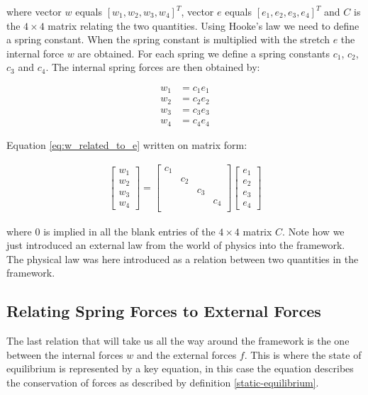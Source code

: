 where vector $w$ equals $[w_1, w_2, w_3, w_4]^T$, vector $e$ equals
$[e_1, e_2, e_3, e_4]^T$ and $C$ is the $4 \times 4$ matrix relating the two
quantities. Using Hooke's law we need to define a spring constant. When
the spring constant is multiplied with the stretch $e$ the internal
force $w$ are obtained. For each spring we define
a spring constants $c_1$, $c_2$, $c_3$ and $c_4$. The internal
spring forces are then obtained by:

\begin{align*}
w_1 &= c_1 e_1 \\
w_2 &= c_2 e_2 \\
w_3 &= c_3 e_3 \\
w_4 &= c_4 e_4
\end{align*}

Equation \eqref{eq:w_related_to_e} written on matrix form:

\begin{align}
\begin{bmatrix}
w_1 \\ w_2\\ w_3 \\ w_4
\end{bmatrix}
=
\begin{bmatrix}
c_1 &  &  &  \\
 & c_2 &  &  \\
 &  & c_3 &  \\
 &  &  & c_4 \\
\end{bmatrix}
\begin{bmatrix}
e_1 \\ e_2 \\ e_3 \\ e_4
\end{bmatrix}
\end{align}

where $0$ is implied in all the blank entries of the $4 \times 4$
matrix $C$. Note how we
just introduced an external law from the world of physics into the
framework. The physical law was here introduced as a relation between
two quantities in the framework. \\

\subsection{Relating Spring Forces to External Forces}
The last relation that will take us all the way around the framework
is the one between the internal 
forces $w$ and the external forces $f$. This is where the state of
equilibrium is represented by a key equation, in this case the equation
describes the conservation of forces as described by definition
\vref{static-equilibrium}.\\


